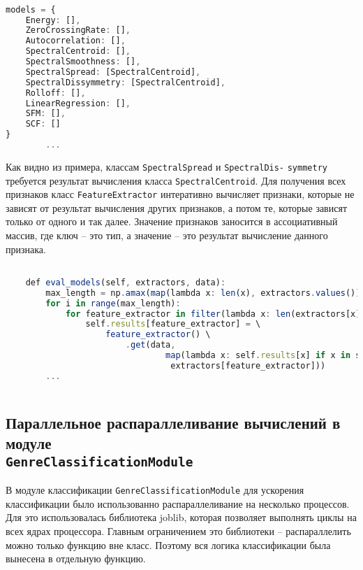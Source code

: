 \begin{lstlisting}[language=TypeScript, label=lst:graph]

models = {
    Energy: [],
    ZeroCrossingRate: [],
    Autocorrelation: [],
    SpectralCentroid: [],
    SpectralSmoothness: [],
    SpectralSpread: [SpectralCentroid],
    SpectralDissymmetry: [SpectralCentroid],
    Rolloff: [],
    LinearRegression: [],
    SFM: [],
    SCF: []
}
        ...
\end{lstlisting}

Как видно из примера, классам \texttt{SpectralSpread} и  \texttt{SpectralDis-} \texttt{symmetry} требуется результат вычисления класса \texttt{SpectralCentroid}. Для получения всех признаков  класс \texttt{FeatureExtractor} интеративно вычисляет признаки, которые не зависят от результат вычисления других признаков, а потом те, которые зависят только от одного и так далее. Значение признаков заносится в ассоциативный массив, где ключ -- это тип, а значение -- это результат вычисление данного признака.

\begin{lstlisting}[language=TypeScript, label=lst:evalgraph]

    def eval_models(self, extractors, data):
        max_length = np.amax(map(lambda x: len(x), extractors.values())) + 1)
        for i in range(max_length):
            for feature_extractor in filter(lambda x: len(extractors[x]) == i, extractors):
                self.results[feature_extractor] = \
                    feature_extractor() \
                        .get(data,
                                map(lambda x: self.results[x] if x in self.results else None,
                                 extractors[feature_extractor]))
        ...
        
\end{lstlisting}

\subsection{Параллельное распараллеливание вычислений в модуле \\ \texttt{GenreClassificationModule}}

В модуле классификации \texttt{GenreClassificationModule} для ускорения классификации было использованно распараллеливание на несколько процессов. Для это использовалась библиотека joblib, которая позволяет выполнять циклы на всех ядрах процессора. Главным ограничением это библиотеки -- распараллелить можно только функцию вне класс. Поэтому вся логика классификации была вынесена в отдельную функцию. 


